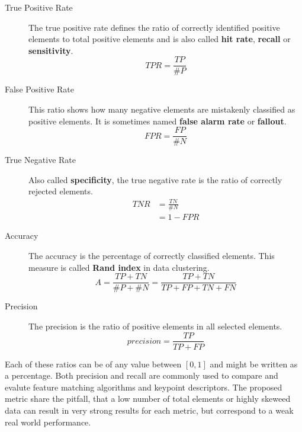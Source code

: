 \begin{description}
    \item[True Positive Rate] The true positive rate defines the ratio of correctly identified positive elements to total positive elements and is also called \textbf{hit rate}, \textbf{recall} or \textbf{sensitivity}.
        \begin{equation}
            TPR = \frac{TP}{\#P}
            \label{eq:true_positive_rate}
        \end{equation}
    \item[False Positive Rate] This ratio shows how many negative elements are mistakenly classified as positive elements. It is sometimes named \textbf{false alarm rate} or \textbf{fallout}.
        \begin{equation}
            FPR = \frac{FP}{\#N}
            \label{eq:false_positive_rate}
        \end{equation}
    \item[True Negative Rate] Also called \textbf{specificity}, the true negative rate is the ratio of correctly rejected elements.
        \begin{equation}
        \begin{aligned}
            TNR &= \frac{TN}{\#N} \\
                &= 1 - FPR
        \end{aligned}
        \label{eq:true_negative_rate}
        \end{equation}
    \item[Accuracy] The accuracy is the percentage of correctly classified elements. This measure is called \textbf{Rand index} in data clustering.
        \begin{equation}
            A = \frac{TP + TN}{\#P + \#N} = \frac{TP + TN}{TP + FP + TN + FN}
            \label{eq:accuracy}
        \end{equation}
    \item[Precision] The precision is the ratio of positive elements in all selected elements.
        \begin{equation}
            precision = \frac{TP}{TP + FP}
        \end{equation}
\end{description}
Each of these ratios can be of any value between $[0, 1]$ and might be written as a percentage.
Both precision and recall are commonly used to compare and evalute feature matching algorithms and keypoint descriptors.
The proposed metric share the pitfall, that a low number of total elements or highly skeweed data can result in very strong results for each metric, but correspond to a weak real world performance.

